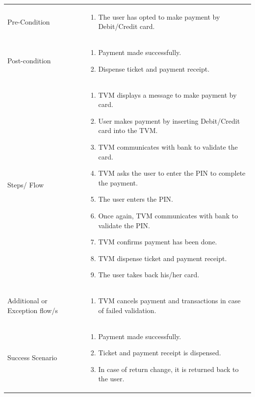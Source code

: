 \documentclass[15pt]{article}
\begin{document}
\begin{enumerate}[leftmargin=2em, itemsep=0pt, parsep=0pt, , font=\Large\bfseries]
\begin{xltabular}{1\textwidth} { 
  | >{\raggedright\arraybackslash}X 
  | >{\raggedright\arraybackslash}X 
  | }
 Pre-Condition  & 
 \begin{enumerate}
  \item The user has opted to make payment by Debit/Credit card.
  \end{enumerate}
  \\
  
   Post-condition  & \begin{enumerate}
  \item Payment made successfully.
  \item Dispense ticket and payment receipt.
  \end{enumerate}
  \\
  
  Steps/ Flow  & \begin{enumerate}
  \item TVM displays a message to make payment by card.
  \item User makes payment by inserting  Debit/Credit card into the TVM.
  \item TVM communicates with bank to validate the card.
  \item TVM asks the user to enter the PIN to complete the payment.
  \item The user enters the PIN.
  \item Once again, TVM communicates with bank to validate the PIN.
  \item TVM confirms payment has been done.
  \item TVM dispense ticket and payment receipt.
  \item The user takes back his/her card.
  \end{enumerate}
  \\
  
   Additional or Exception flow/s  & \begin{enumerate}
  \item  TVM cancels payment and transactions in case of failed validation. 
  \end{enumerate}
  \\
    
   Success Scenario  & \begin{enumerate}
  \item Payment made successfully.
  \item Ticket and payment receipt is dispensed.
  \item In case of return change, it is returned back to the user.
  \end{enumerate}
  \\


\end{xltabular}
\end{enumerate}
\end{document}

